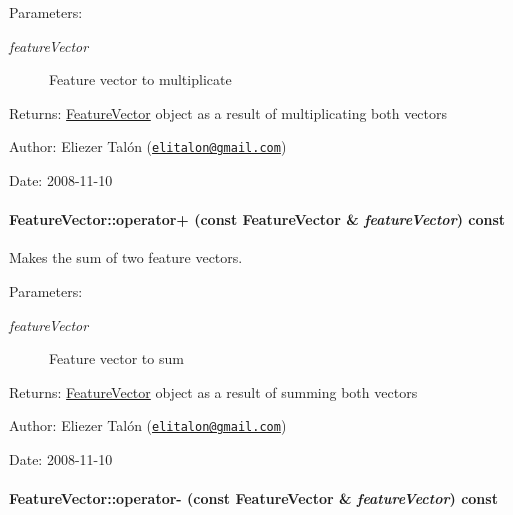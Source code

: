 \begin{Desc}
\item[Parameters:]
\begin{description}
\item[{\em featureVector}]Feature vector to multiplicate\end{description}
\end{Desc}
\begin{Desc}
\item[Returns:]\hyperlink{class_feature_vector}{FeatureVector} object as a result of multiplicating both vectors\end{Desc}
\begin{Desc}
\item[Author:]Eliezer Talón (\href{mailto:elitalon@gmail.com}{\tt elitalon@gmail.com}) \end{Desc}
\begin{Desc}
\item[Date:]2008-11-10 \end{Desc}
\hypertarget{class_feature_vector_58a2309387bd18d956e16c148585352a}{
\paragraph[{operator+}]{ FeatureVector::operator+ (const {\bf FeatureVector} \& {\em featureVector}) const}\hfill}
\label{class_feature_vector_58a2309387bd18d956e16c148585352a}


Makes the sum of two feature vectors. 

\begin{Desc}
\item[Parameters:]
\begin{description}
\item[{\em featureVector}]Feature vector to sum\end{description}
\end{Desc}
\begin{Desc}
\item[Returns:]\hyperlink{class_feature_vector}{FeatureVector} object as a result of summing both vectors\end{Desc}
\begin{Desc}
\item[Author:]Eliezer Talón (\href{mailto:elitalon@gmail.com}{\tt elitalon@gmail.com}) \end{Desc}
\begin{Desc}
\item[Date:]2008-11-10 \end{Desc}
\hypertarget{class_feature_vector_fa1a86fbb34177281854406deea435ab}{
\paragraph[{operator-}]{ FeatureVector::operator- (const {\bf FeatureVector} \& {\em featureVector}) const}\hfill}
\label{class_feature_vector_fa1a86fbb34177281854406deea435ab}


